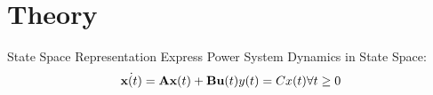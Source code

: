 \section[Theory]{Theory}
\label{sec:lasso_theory}

\begin{frame}[fragile]{State Space Representation}
	Express Power System Dynamics in State Space:
	\begin{equation}
		\label{eq:ssr}
		\dot{\textbf{x}(t)} = \textbf{A}\textbf{x}(t)
		+ \textbf{B}\textbf{u}(t)\\
		 y(t) = Cx(t) \forall t\geq0
	\end{equation}
\end{frame}